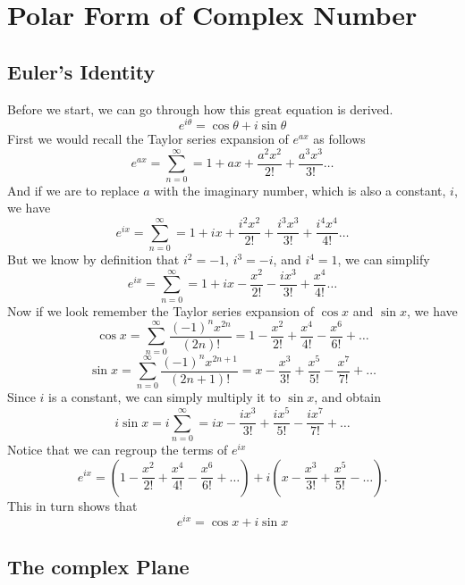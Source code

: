 \documentclass[12pt]{book}
\begin{document}
\newpage
\section{Polar Form of Complex Number}
\subsection{Euler's Identity}
Before we start, we can go through how this great equation is derived.
\[
e^{i\theta} = \cos\theta+i\sin\theta
\]
First we would recall the Taylor series expansion of $e^{ax}$ as follows
\[
e^{ax} = \sum_{n=0}^{\infty} =1 + ax + \frac{a^2x^2}{2!}+ \frac{a^3x^3}{3!}\ldots
\]
And if we are to replace $a$ with the imaginary number, which is also a constant, $i$, we have
\[
e^{ix} = \sum_{n=0}^{\infty} =1 + ix + \frac{i^2x^2}{2!}+ \frac{i^3x^3}{3!}+\frac{i^4x^4}{4!}\ldots
\]
But we know by definition that $i^2 = -1$, $i^3 = -i$, and $i^4=1$, we can simplify
\[
e^{ix} = \sum_{n=0}^{\infty} =1 + ix - \frac{x^2}{2!} - \frac{ix^3}{3!} + \frac{x^4}{4!} \ldots
\]
Now if we look remember the Taylor series expansion of $\cos x$ and $\sin x$, we have
\[
\cos x = \sum_{n=0}^{\infty} \frac{(-1)^n x^{2n}}{(2n)!} = 1 - \frac{x^2}{2!} + \frac{x^4}{4!} - \frac{x^6}{6!} + \ldots
\]
\[
\sin x = \sum_{n=0}^{\infty} \frac{(-1)^n x^{2n+1}}{(2n+1)!} = x - \frac{x^3}{3!} + \frac{x^5}{5!} - \frac{x^7}{7!} + \ldots
\]
Since $i$ is a constant, we can simply multiply it to $\sin x$, and obtain
\[
i\sin x = i\sum_{n=0}^{\infty} = ix - \frac{ix^3}{3!} + \frac{ix^5}{5!} - \frac{ix^7}{7!} + \ldots
\]
Notice that we can regroup the terms of $e^{ix}$
\[
e^{ix} = \left(1 - \frac{x^2}{2!} + \frac{x^4}{4!} - \frac{x^6}{6!} + \ldots \right) + i \left(x - \frac{x^3}{3!} + \frac{x^5}{5!} - \ldots \right).
\]
This in turn shows that
\[
e^{ix} = \cos x + i\sin x
\]

\subsection{The complex Plane}
\end{document}
